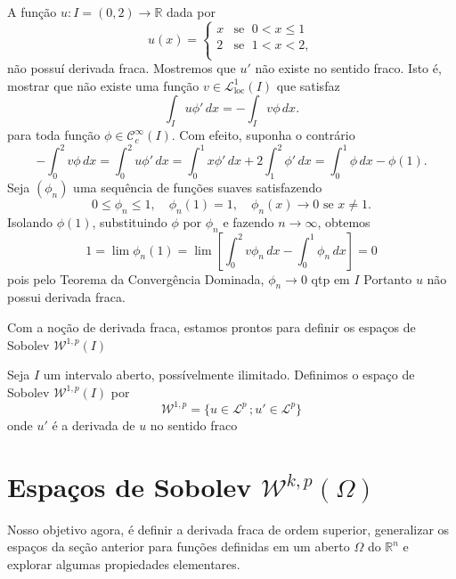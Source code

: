 \documentclass[a4paper, 11pt]{book}
\theoremstyle{definition}
\newcommand{\bR}{\mathbb{R}}
\newcommand{\cC}{\mathcal{C}}
\newcommand{\cL}{\mathcal{L}}
\newcommand{\cW}{\mathcal{W}}
\newcommand{\loc}{\mathrm{loc}}
\begin{document}
\begin{ex}
    A função $u : I  = (0,2) \to \bR$ dada por
    \[
        u(x) = \left\{
            \begin{array}{rl}
                x & \text{se }\; 0 < x \leqslant 1\\
                2 & \text{se }\; 1 < x < 2,\\
            \end{array}
        \right.
    \]
    não possuí derivada fraca.
    Mostremos que $u'$ não existe no sentido fraco.
    Isto é, mostrar que não existe uma função $v \in \cL^1_\loc(I)$ que satisfaz
    \[
        \int_I u \phi' \, dx = -\int_I v \phi \,dx.
    \]
    para toda função $\phi \in \cC_c^\infty(I)$. 
    Com efeito, suponha o contrário
    \[
        -\int_0^2 v \phi \, dx = \int_0^2 u \phi' \,dx = \int_0^1 x \phi' \,dx + 2\int_1^2 \phi' \,dx = \int_0^1 \phi \,dx - \phi(1).
    \]
    Seja $(\phi_n)$ uma sequência de funções suaves satisfazendo
    \[
        0 \leqslant \phi_n \leqslant 1, \quad \phi_n(1) = 1, \quad \phi_n(x) \to 0 \text{ se } x \neq 1.
    \]
    Isolando $\phi(1)$, substituindo $\phi$ por $\phi_n$ e fazendo $n \to \infty$, obtemos
    \[
        1 = \lim \phi_n(1) = \lim \left[ \int_0^2 v \phi_n \, dx- \int_0^1 \phi_n \,dx \right] = 0
    \]
    pois pelo Teorema da Convergência Dominada, $\phi_n \to 0$ qtp em $I$
    Portanto $u$ não possui derivada fraca.
\end{ex}

Com a noção de derivada fraca, estamos prontos para definir os espaços de Sobolev $\cW^{1,p}(I)$

\begin{dbox}
    Seja $I$ um intervalo aberto, possívelmente ilimitado.
    Definimos o espaço de Sobolev $\cW^{1,p}(I)$ por
    \[
        \cW^{1,p} = \{u \in \cL^p \,; u' \in \cL^p\}
    \]
    onde $u'$ é a derivada de $u$ no sentido fraco
\end{dbox}

\section{Espaços de Sobolev $\cW^{k,p}(\Omega)$}

Nosso objetivo agora, é definir a derivada fraca de ordem superior, generalizar os espaços da seção anterior para funções definidas em um aberto $\Omega$ do $\bR^n$ e explorar algumas propiedades elementares.
\end{document}
